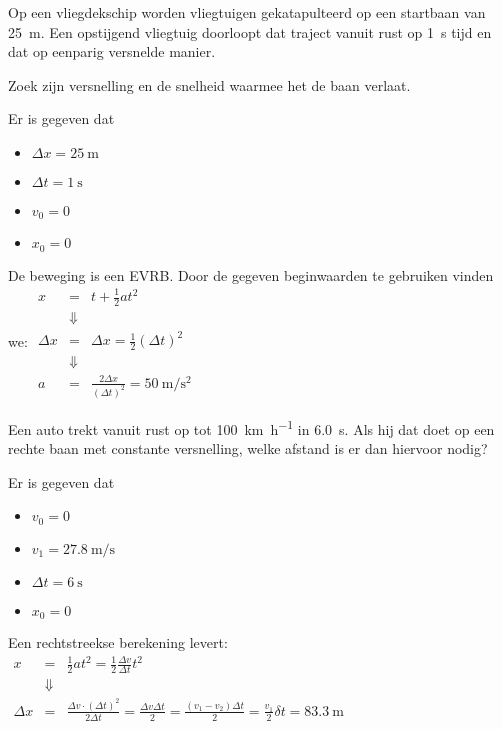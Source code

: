 \documentclass{ximera}
\begin{document}
\begin{exercise}
    Op een vliegdekschip worden vliegtuigen gekatapulteerd op een startbaan van \SI{25}{\meter}. 
    Een opstijgend vliegtuig doorloopt dat traject vanuit rust op \SI{1}{\second} tijd en dat op eenparig versnelde manier.

    Zoek zijn versnelling en de snelheid waarmee het de baan verlaat.
    \begin{oplossing}
        Er is gegeven dat
        \begin{itemize}
            \item \(\Delta x = \SI{25}{\meter}\)
            \item \(\Delta t = \SI{1}{\second}\)
            \item \(v_0 = 0\)
            \item \(x_0 = 0\)
        \end{itemize}

        De beweging is een EVRB. Door de gegeven beginwaarden te gebruiken vinden we: 
        \(
        \begin{array}{rcl}
            x &=& t + \frac{1}{2}at^2 \\ 
            &\Downarrow&\\
            \Delta x &=& \Delta x = \frac{1}{2}(\Delta t)^2 \\
            &\Downarrow&\\
            a &=& \frac{2\Delta x}{(\Delta t)^2} = \SI{50}{\meter\per\second\squared}
            
        \end{array}
        \)
    \end{oplossing}
\end{exercise}

\begin{exercise}
    Een auto trekt vanuit rust op tot \SI{100}{\kilo\meter\per\hour} in \SI{6,0}{s}. Als hij dat doet op een rechte baan met constante versnelling, welke afstand is er dan hiervoor nodig?
    \begin{oplossing}
        Er is gegeven dat 
        \begin{itemize}
            \item \(v_0 = 0\)
            \item \(v_1 = \SI{27,8}{\meter\per\second}\)
            \item \(\Delta t = \SI{6}{\second}\)
            \item \(x_0 = 0\)
        \end{itemize}
        Een rechtstreekse berekening levert: 
        \(
        \begin{array}{rcl}
            x&=& \frac{1}{2}a t^2 = \frac{1}{2}\frac{\Delta v}{\Delta t}t^2\\
            &\Downarrow&\\
            \Delta x &=& \frac{\Delta v \cdot (\Delta t)^2}{2\Delta t} = \frac{\Delta v \Delta t}{2} = \frac{(v_1 - v_2)\Delta t}{2} = \frac{v_1}{2} \delta t = \SI{83,3}{\meter}
            
        \end{array}\)
    \end{oplossing}
\end{exercise}
\end{document}
